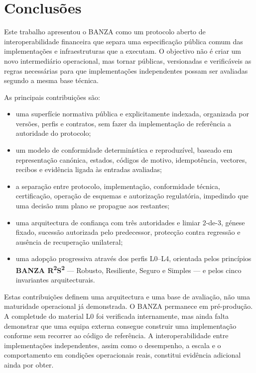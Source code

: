 \documentclass[journal abbreviation, manuscript]{copernicus}
\begin{document}
\newpage
\section{Conclusões}\label{sec:conclusion}

Este trabalho apresentou o BANZA como um protocolo aberto de interoperabilidade financeira que separa uma especificação pública comum das implementações e infraestruturas que a executam. O objectivo não é criar um novo intermediário operacional, mas tornar públicas, versionadas e verificáveis as regras necessárias para que implementações independentes possam ser avaliadas segundo a mesma base técnica.

As principais contribuições são:

\begin{itemize}
  \item uma superfície normativa pública e explicitamente indexada, organizada por versões, perfis e contratos, sem fazer da implementação de referência a autoridade do protocolo;

  \item um modelo de conformidade determinística e reproduzível, baseado em representação canónica, estados, códigos de motivo, idempotência, vectores, recibos e evidência ligada às entradas avaliadas;

  \item a separação entre protocolo, implementação, conformidade técnica, certificação, operação de esquemas e autorização regulatória, impedindo que uma decisão num plano se propague aos restantes;

  \item uma arquitectura de confiança com três autoridades e limiar 2-de-3, génese fixado, sucessão autorizada pelo predecessor, protecção contra regressão e ausência de recuperação unilateral;

  \item uma adopção progressiva através dos perfis L0--L4, orientada pelos princípios \textbf{BANZA R\textsuperscript{2}S\textsuperscript{2}} --- Robusto, Resiliente, Seguro e Simples --- e pelos cinco invariantes arquitecturais.
\end{itemize}

Estas contribuições definem uma arquitectura e uma base de avaliação, não uma maturidade operacional já demonstrada. O BANZA permanece em pré-produção. A completude do material L0 foi verificada internamente, mas ainda falta demonstrar que uma equipa externa consegue construir uma implementação conforme sem recorrer ao código de referência. A interoperabilidade entre implementações independentes, assim como o desempenho, a escala e o comportamento em condições operacionais reais, constitui evidência adicional ainda por obter.
\end{document}
